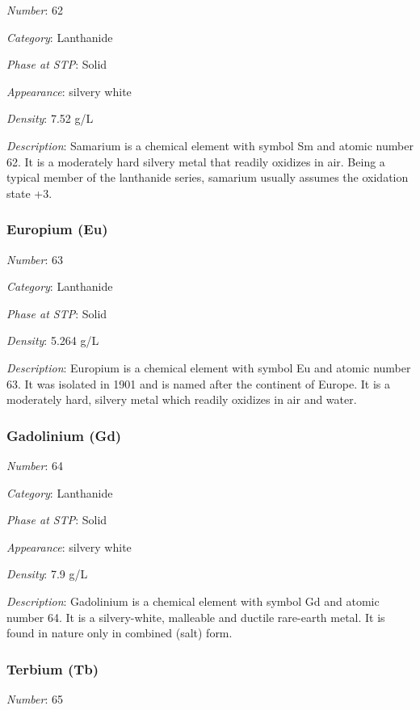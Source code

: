 \documentclass{article}
\begin{document}
\textit{Number}: 62

\textit{Category}: Lanthanide

\textit{Phase at STP}: Solid

\textit{Appearance}: silvery white

\textit{Density}: 7.52 g/L

\textit{Description}: Samarium is a chemical element with symbol Sm and atomic number 62. It is a moderately hard silvery metal that readily oxidizes in air. Being a typical member of the lanthanide series, samarium usually assumes the oxidation state +3.

\hypertarget{subsubsection::Eu}{}\subsubsection{Europium (Eu)}

\textit{Number}: 63

\textit{Category}: Lanthanide

\textit{Phase at STP}: Solid

\textit{Density}: 5.264 g/L

\textit{Description}: Europium is a chemical element with symbol Eu and atomic number 63. It was isolated in 1901 and is named after the continent of Europe. It is a moderately hard, silvery metal which readily oxidizes in air and water.

\hypertarget{subsubsection::Gd}{}\subsubsection{Gadolinium (Gd)}

\textit{Number}: 64

\textit{Category}: Lanthanide

\textit{Phase at STP}: Solid

\textit{Appearance}: silvery white

\textit{Density}: 7.9 g/L

\textit{Description}: Gadolinium is a chemical element with symbol Gd and atomic number 64. It is a silvery-white, malleable and ductile rare-earth metal. It is found in nature only in combined (salt) form.

\hypertarget{subsubsection::Tb}{}\subsubsection{Terbium (Tb)}

\textit{Number}: 65
\end{document}
